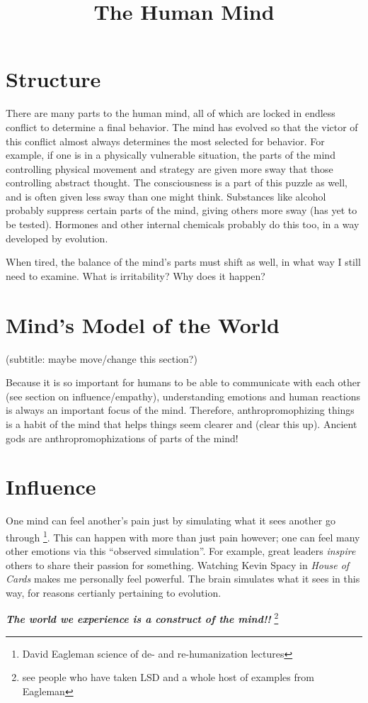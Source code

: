 \documentclass{amsart}
\title{The Human Mind}
\begin{document}
\maketitle

\section{Structure}

There are many parts to the human mind, all of which are locked in endless conflict to determine a final behavior.  The mind has evolved so that the victor of this conflict almost always determines the most selected for behavior.  For example, if one is in a physically vulnerable situation, the parts of the mind controlling physical movement and strategy are given more sway that those controlling abstract thought.  The consciousness is a part of this puzzle as well, and is often given less sway than one might think.  Substances like alcohol probably suppress certain parts of the mind, giving others more sway (has yet to be tested).  Hormones and other internal chemicals probably do this too, in a way developed by evolution.  
\par
When tired, the balance of the mind's parts must shift as well, in what way I still need to examine.  What is irritability?  Why does it happen?

\section{Mind's Model of the World}

(subtitle: maybe move/change this section?)
\par
Because it is so important for humans to be able to communicate with each other (see section on influence/empathy), understanding emotions and human reactions is always an important focus of the mind.  Therefore, anthropromophizing things is a habit of the mind that helps things seem clearer and (clear this up).  Ancient gods are anthropromophizations of parts of the mind!  

\section{Influence}

One mind can feel another's pain just by simulating what it sees another go through \footnote{David Eagleman science of de- and re-humanization lectures}.  This can happen with more than just pain however; one can feel many other emotions via this ``observed simulation''.  For example, great leaders \textit{inspire} others to share their passion for something.  Watching Kevin Spacy in \emph{House of Cards} makes me personally feel powerful.  The brain simulates what it sees in this way, for reasons certianly pertaining to evolution.  
\par
\textit{\textbf{The world we experience is a construct of the mind!!}} \footnote{see people who have taken LSD and a whole host of examples from Eagleman}
\end{document}
